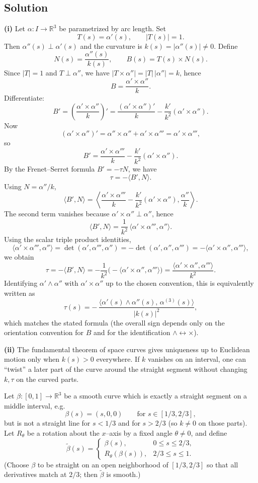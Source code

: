 \documentclass[12pt,a4paper]{article}
\theoremstyle{plain}
\theoremstyle{definition}      %
\begin{document}
\subsection*{Solution}
\noindent\textbf{(i)}
Let $\alpha:I\to\mathbb{R}^3$ be parametrized by arc length. Set
\[
T(s)=\alpha'(s),\qquad |T(s)|=1.
\]
Then $\alpha''(s)\perp \alpha'(s)$ and the curvature is $k(s)=|\alpha''(s)|\neq 0$.
Define
\[
N(s)=\frac{\alpha''(s)}{k(s)},\qquad 
B(s)=T(s)\times N(s).
\]
Since $|T|=1$ and $T\perp \alpha''$, we have $|T\times \alpha''|=|T|\,|\alpha''|=k$, hence
\[
B=\frac{\alpha'\times \alpha''}{k}.
\]
Differentiate:
\[
B'=\left(\frac{\alpha'\times \alpha''}{k}\right)'
=\frac{(\alpha'\times \alpha'')'}{k}-\frac{k'}{k^2}(\alpha'\times \alpha'').
\]
Now
\[
(\alpha'\times \alpha'')'=\alpha''\times \alpha''+\alpha'\times \alpha'''
=\alpha'\times \alpha''',
\]
so
\[
B'=\frac{\alpha'\times \alpha'''}{k}-\frac{k'}{k^2}(\alpha'\times \alpha'').
\]
By the Frenet--Serret formula $B'=-\tau N$, we have
\[
\tau=-\langle B',N\rangle.
\]
Using $N=\alpha''/k$,
\[
\langle B',N\rangle
=
\left\langle
\frac{\alpha'\times \alpha'''}{k}-\frac{k'}{k^2}(\alpha'\times \alpha''),
\frac{\alpha''}{k}
\right\rangle.
\]
The second term vanishes because $\alpha'\times\alpha''\perp\alpha''$, hence
\[
\langle B',N\rangle=\frac{1}{k^2}\,\langle \alpha'\times \alpha''',\alpha''\rangle.
\]
Using the scalar triple product identities,
\[
\langle \alpha'\times \alpha''',\alpha''\rangle
=\det(\alpha',\alpha''',\alpha'')
=-\det(\alpha',\alpha'',\alpha''')
=-\langle \alpha'\times\alpha'',\alpha'''\rangle,
\]
we obtain
\[
\tau
=-\langle B',N\rangle
=-\frac{1}{k^2}\big(-\langle \alpha'\times\alpha'',\alpha'''\rangle\big)
=
\frac{\langle \alpha'\times\alpha'',\alpha'''\rangle}{k^2}.
\]
Identifying $\alpha'\wedge\alpha''$ with $\alpha'\times\alpha''$ up to the chosen convention,
this is equivalently written as
\[
\tau(s)=-\,\frac{\big\langle \alpha'(s)\wedge \alpha''(s),\,\alpha^{(3)}(s)\big\rangle}{|k(s)|^2},
\]
which matches the stated formula (the overall sign depends only on the orientation convention for $B$
and for the identification $\wedge\leftrightarrow\times$).

\medskip
\noindent\textbf{(ii)}
The fundamental theorem of space curves gives uniqueness up to Euclidean motion only when $k(s)>0$ everywhere.
If $k$ vanishes on an interval, one can ``twist'' a later part of the curve around the straight segment
without changing $k,\tau$ on the curved parts.

Let $\beta:[0,1]\to\mathbb{R}^3$ be a smooth curve which is exactly a straight segment on a middle interval, e.g.
\[
\beta(s)=(s,0,0)\qquad \text{for } s\in[1/3,2/3],
\]
but is not a straight line for $s<1/3$ and for $s>2/3$ (so $k\neq 0$ on those parts).
Let $R_\theta$ be a rotation about the $x$--axis by a fixed angle $\theta\neq 0$, and define
\[
\widetilde\beta(s)=
\begin{cases}
	\beta(s), & 0\le s\le 2/3,\\
	R_\theta(\beta(s)), & 2/3\le s\le 1.
\end{cases}
\]
(Choose $\beta$ to be straight on an open neighborhood of $[1/3,2/3]$ so that all derivatives match at $2/3$;
then $\widetilde\beta$ is smooth.)
\end{document}
